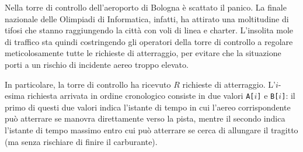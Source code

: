 \usepackage{xcolor}
\usepackage{afterpage}
\usepackage{pifont,mdframed}
\usepackage[bottom]{footmisc}



\newcommand{\inputfile}{\texttt{input.txt}}
\newcommand{\outputfile}{\texttt{output.txt}}

\newenvironment{warning}
  {\par\begin{mdframed}[linewidth=2pt,linecolor=gray]%
    \begin{list}{}{\leftmargin=1cm
                   \labelwidth=\leftmargin}\item[\Large\ding{43}]}
  {\end{list}\end{mdframed}\par}

\newcommand{\funcitem}[2]{\item[$\blacksquare$] \textbf{\large \textsf{Funzione} \texttt{#1}} \vspace{-0.3cm} \begin{center}\begin{tabularx}{\textwidth}{|c|X|} \hline #2 \hline \end{tabularx}\end{center}}



	Nella torre di controllo dell'aeroporto di Bologna è scattato il panico. La finale nazionale delle Olimpiadi di Informatica, infatti, ha attirato una moltitudine di tifosi che stanno raggiungendo la città con voli di linea e charter. L'insolita mole di traffico sta quindi costringendo gli operatori della torre di controllo a regolare meticolosamente tutte le richieste di atterraggio, per evitare che la situazione porti a un rischio di incidente aereo troppo elevato.

	In particolare, la torre di controllo ha ricevuto $R$ richieste di atterraggio. L'$i$-esima richiesta arrivata in ordine cronologico consiste in due valori \texttt{A[$i$]} e \texttt{B[$i$]}: il primo di questi due valori indica l'istante di tempo in cui l'aereo corrispondente può atterrare se manovra direttamente verso la pista, mentre il secondo indica l'istante di tempo massimo entro cui può atterrare se cerca di allungare il tragitto (ma senza rischiare di finire il carburante).


